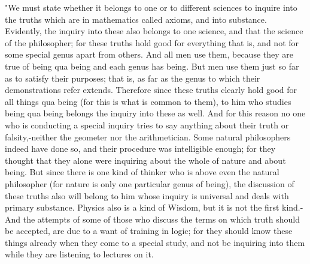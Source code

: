 "We must state whether it belongs to one or to different sciences
to inquire into the truths which are in mathematics called axioms,
and into substance. Evidently, the inquiry into these also belongs
to one science, and that the science of the philosopher; for these
truths hold good for everything that is, and not for some special
genus apart from others. And all men use them, because they are true
of being qua being and each genus has being. But men use them just
so far as to satisfy their purposes; that is, as far as the genus
to which their demonstrations refer extends. Therefore since these
truths clearly hold good for all things qua being (for this is what
is common to them), to him who studies being qua being belongs the
inquiry into these as well. And for this reason no one who is conducting
a special inquiry tries to say anything about their truth or falsity,-neither
the geometer nor the arithmetician. Some natural philosophers indeed
have done so, and their procedure was intelligible enough; for they
thought that they alone were inquiring about the whole of nature and
about being. But since there is one kind of thinker who is above even
the natural philosopher (for nature is only one particular genus of
being), the discussion of these truths also will belong to him whose
inquiry is universal and deals with primary substance. Physics also
is a kind of Wisdom, but it is not the first kind.-And the attempts
of some of those who discuss the terms on which truth should be accepted,
are due to a want of training in logic; for they should know these
things already when they come to a special study, and not be inquiring
into them while they are listening to lectures on it. 

